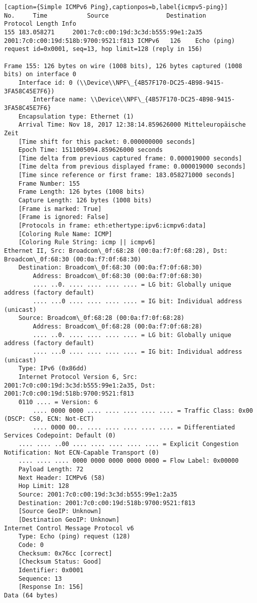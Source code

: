 \begin{lstlisting}[caption={Simple ICMPv6 Ping},captionpos=b,label{icmpv5-ping}]
No.     Time           Source                Destination           Protocol Length Info
155 183.058271     2001:7c0:c00:19d:3c3d:b555:99e1:2a35 2001:7c0:c00:19d:518b:9700:9521:f813 ICMPv6   126    Echo (ping) request id=0x0001, seq=13, hop limit=128 (reply in 156)

Frame 155: 126 bytes on wire (1008 bits), 126 bytes captured (1008 bits) on interface 0
	Interface id: 0 (\\Device\\NPF\_{4B57F170-DC25-4B98-9415-3FA58C45E7F6})
		Interface name: \\Device\\NPF\_{4B57F170-DC25-4B98-9415-3FA58C45E7F6}
	Encapsulation type: Ethernet (1)
	Arrival Time: Nov 18, 2017 12:38:14.859626000 Mitteleuropäische Zeit
	[Time shift for this packet: 0.000000000 seconds]
	Epoch Time: 1511005094.859626000 seconds
	[Time delta from previous captured frame: 0.000019000 seconds]
	[Time delta from previous displayed frame: 0.000019000 seconds]
	[Time since reference or first frame: 183.058271000 seconds]
	Frame Number: 155
	Frame Length: 126 bytes (1008 bits)
	Capture Length: 126 bytes (1008 bits)
	[Frame is marked: True]
	[Frame is ignored: False]
	[Protocols in frame: eth:ethertype:ipv6:icmpv6:data]
	[Coloring Rule Name: ICMP]
	[Coloring Rule String: icmp || icmpv6]
Ethernet II, Src: Broadcom\_0f:68:28 (00:0a:f7:0f:68:28), Dst: Broadcom\_0f:68:30 (00:0a:f7:0f:68:30)
	Destination: Broadcom\_0f:68:30 (00:0a:f7:0f:68:30)
		Address: Broadcom\_0f:68:30 (00:0a:f7:0f:68:30)
		.... ..0. .... .... .... .... = LG bit: Globally unique address (factory default)
		.... ...0 .... .... .... .... = IG bit: Individual address (unicast)
	Source: Broadcom\_0f:68:28 (00:0a:f7:0f:68:28)
		Address: Broadcom\_0f:68:28 (00:0a:f7:0f:68:28)
		.... ..0. .... .... .... .... = LG bit: Globally unique address (factory default)
		.... ...0 .... .... .... .... = IG bit: Individual address (unicast)
	Type: IPv6 (0x86dd)
	Internet Protocol Version 6, Src: 2001:7c0:c00:19d:3c3d:b555:99e1:2a35, Dst: 2001:7c0:c00:19d:518b:9700:9521:f813
	0110 .... = Version: 6
		.... 0000 0000 .... .... .... .... .... = Traffic Class: 0x00 (DSCP: CS0, ECN: Not-ECT)
		.... 0000 00.. .... .... .... .... .... = Differentiated Services Codepoint: Default (0)
	.... .... ..00 .... .... .... .... .... = Explicit Congestion Notification: Not ECN-Capable Transport (0)
	.... .... .... 0000 0000 0000 0000 0000 = Flow Label: 0x00000
	Payload Length: 72
	Next Header: ICMPv6 (58)
	Hop Limit: 128
	Source: 2001:7c0:c00:19d:3c3d:b555:99e1:2a35
	Destination: 2001:7c0:c00:19d:518b:9700:9521:f813
	[Source GeoIP: Unknown]
	[Destination GeoIP: Unknown]
Internet Control Message Protocol v6
	Type: Echo (ping) request (128)
	Code: 0
	Checksum: 0x76cc [correct]
	[Checksum Status: Good]
	Identifier: 0x0001
	Sequence: 13
	[Response In: 156]
Data (64 bytes)



\end{lstlisting}
